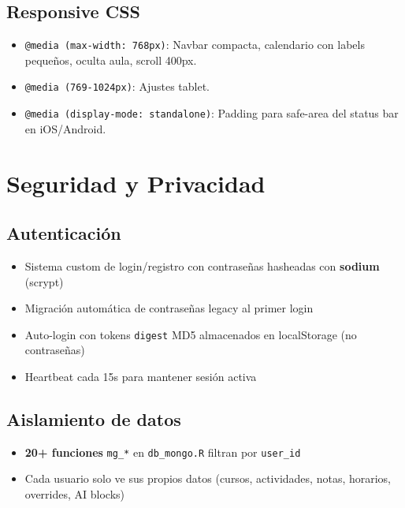 \documentclass[
  spanish,
  11pt,
  a4paper,
]{article}
\providecommand{\tightlist}{%
  \setlength{\itemsep}{0pt}\setlength{\parskip}{0pt}}
\begin{document}
\subsection{Responsive CSS}\label{responsive-css}

\begin{itemize}
\tightlist
\item
  \texttt{@media\ (max-width:\ 768px)}: Navbar compacta, calendario con
  labels pequeños, oculta aula, scroll 400px.
\item
  \texttt{@media\ (769-1024px)}: Ajustes tablet.
\item
  \texttt{@media\ (display-mode:\ standalone)}: Padding para safe-area
  del status bar en iOS/Android.
\end{itemize}

\section{Seguridad y Privacidad}\label{seguridad-y-privacidad}

\subsection{Autenticación}\label{autenticaciuxf3n}

\begin{itemize}
\tightlist
\item
  Sistema custom de login/registro con contraseñas hasheadas con
  \textbf{sodium} (scrypt)
\item
  Migración automática de contraseñas legacy al primer login
\item
  Auto-login con tokens \texttt{digest} MD5 almacenados en localStorage
  (no contraseñas)
\item
  Heartbeat cada 15s para mantener sesión activa
\end{itemize}

\subsection{Aislamiento de datos}\label{aislamiento-de-datos}

\begin{itemize}
\tightlist
\item
  \textbf{20+ funciones} \texttt{mg\_*} en \texttt{db\_mongo.R} filtran
  por \texttt{user\_id}
\item
  Cada usuario solo ve sus propios datos (cursos, actividades, notas,
  horarios, overrides, AI blocks)
\end{itemize}
\end{document}
